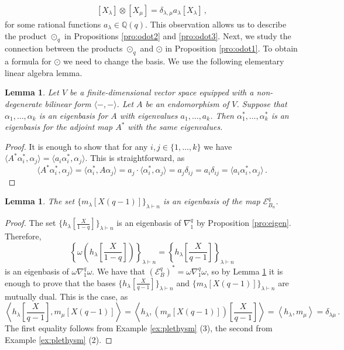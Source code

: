 \documentclass[12pt,a4paper]{amsart}
\theoremstyle{plain}
\newtheorem{lemma}[tw]{Lemma}
\theoremstyle{definition}
\theoremstyle{remark}
\newcommand{\QQ}{\mathbb{Q}}
\newcommand{\E}{\mathcal{E}}
\begin{document}
\begin{align} \label{w:6}
	[X_\lambda]\otimes [X_\mu]=\delta_{\lambda,\mu}a_\lambda[X_\lambda] \,,
\end{align}
for some rational functions $a_\lambda \in \QQ(q)$. This observation allows us to describe the product $\odot_q$ in Propositions \ref{pro:odot2} and \ref{pro:odot3}. Next, we study the connection between the products $\odot_q$ and $\odot$ in Proposition \ref{pro:odot1}. To obtain a formula for $\odot$ we need to change the basis. We use the following elementary linear algebra lemma.
\begin{lemma} \label{lem:odot1}
	Let $V$ be a finite-dimensional vector space equipped with a non-degenerate bilinear form $\langle-,-\rangle$. Let $A$ be an endomorphism of $V$. Suppose that $\alpha_1,\dots,\alpha_k$ is an eigenbasis for $A$ with eigenvalues $a_1,\dots,a_k$. Then $\alpha^*_1,\dots,\alpha^*_k$ is an eigenbasis for the adjoint map $A^*$ with the same eigenvalues. 
\end{lemma}
\begin{proof}
	It is enough to show that for any $i,j\in\{1,\dots, k\}$ we have
	$\langle A^*\alpha^*_i,\alpha_j\rangle=\langle a_i\alpha^*_i,\alpha_j\rangle$. This is straightforward, as
	\[
	\langle A^*\alpha^*_i,\alpha_j\rangle=\langle \alpha^*_i,A\alpha_j\rangle=
	a_j \cdot \langle \alpha^*_i,\alpha_j\rangle =a_j\delta_{ij}=a_i\delta_{ij}= \langle a_i\alpha^*_i,\alpha_j\rangle\,.
	\] \qedhere
\end{proof}
\begin{lemma} \label{lem:odot2}
	The set $\{m_\lambda[X(q-1)]\}_{\lambda\vdash n}$ is an eigenbasis of the map $\E^q_{B_n}$.
\end{lemma}
\begin{proof}
	The set $\{h_\lambda[\frac{X}{1-q}]\}_{\lambda\vdash n}$ is an eigenbasis of $\nabla^q_{1}$ by Proposition \ref{pro:eigen}. Therefore,
	$$\left\{\omega\left(h_\lambda\left[\frac{X}{1-q}\right]\right)\right\}_{\lambda\vdash n}=
	\left\{h_\lambda\left[\frac{X}{q-1}\right]\right\}_{\lambda\vdash n}$$
	is an eigenbasis of $\omega\nabla^q_{1}\omega$. We have that $(\E^q_{B})^*=\omega\nabla^q_{1}\omega$, so by Lemma \ref{lem:odot1} it is enough to prove that the bases $\{h_\lambda[\frac{X}{q-1}]\}_{\lambda\vdash n}$ and $\{m_\lambda[X(q-1)]\}_{\lambda\vdash n}$ are mutually dual. This is the case, as
	$$
	\left\langle h_\lambda\left[\frac{X}{q-1}\right], m_\mu[X(q-1)]\right\rangle=
	\left\langle h_\lambda, (m_\mu[X(q-1)])\left[\frac{X}{q-1}\right]\right\rangle=
	\left\langle h_\lambda, m_\mu\right\rangle =\delta_{\lambda\mu}\,.
	$$
	The first equality follows from Example \ref{ex:plethysm} (3),
	the second from Example \ref{ex:plethysm} (2).
\end{proof}
\end{document}

